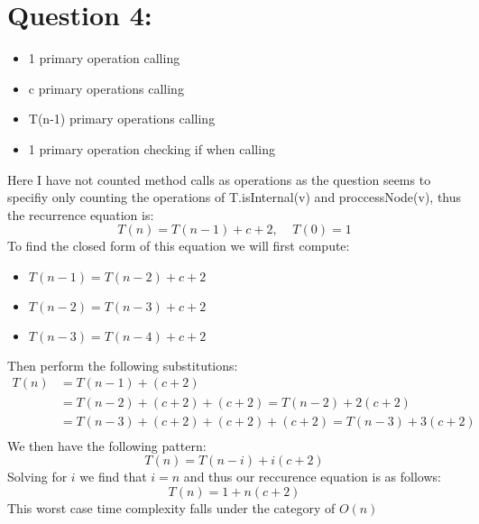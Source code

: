 \documentclass{article}
\begin{document}
\newpage
\section*{Question 4:}
\begin{itemize}
    \item 1 primary operation calling 
    \item c primary operations calling 
    \item T(n-1) primary operations calling 
    \item 1 primary operation checking if  when calling 
\end{itemize}
Here I have not counted method calls as operations as the question seems to specifiy only counting the operations of T.isInternal(v) and proccessNode(v), thus the recurrence equation is:
$$T(n) = T(n-1)+c+2,\;\;\;\;T(0)=1$$
To find the closed form of this equation we will first compute:
\begin{itemize}
    \item $T(n-1)=T(n-2) + c + 2$
    \item $T(n-2)=T(n-3) + c + 2$
    \item $T(n-3)=T(n-4) + c + 2$
\end{itemize}
Then perform the following substitutions:
$$\begin{aligned}
    T(n)&=T(n-1)+(c+2)\\
    &=T(n-2)+(c+2)+(c+2)=T(n-2)+2(c+2)\\
    &=T(n-3)+(c+2)+(c+2)+(c+2)=T(n-3)+3(c+2)\\
\end{aligned}$$
We then have the following pattern: $$T(n)=T(n-i)+i(c+2)$$
Solving for $i$ we find that $i=n$ and thus our reccurence equation is as follows:$$T(n)=1+n(c+2)$$
This worst case time complexity falls under the category of $O(n)$
\end{document}

